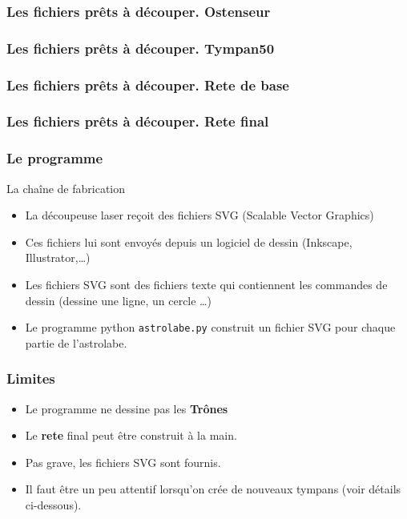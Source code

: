 \documentclass{beamer}
\begin{document}
\begin{frame}\frametitle{Les fichiers prêts à découper.  Ostenseur}
\begin{center}
\end{center}
   \end{frame}
   
\begin{frame}\frametitle{Les fichiers prêts à découper.  Tympan50}
\begin{center}
\end{center}
   \end{frame}
   

\begin{frame}\frametitle{Les fichiers prêts à découper.  Rete de base}
\begin{center}
\end{center}
   \end{frame}
   
\begin{frame}\frametitle{Les fichiers prêts à découper.  Rete final}
\begin{center}
\end{center}
   \end{frame}
   
\begin{frame}\frametitle{Le programme}
\begin{block}{La chaîne de fabrication}
\begin{itemize}
\item La découpeuse laser reçoit des fichiers SVG (Scalable Vector Graphics)
\item Ces fichiers lui sont envoyés depuis un logiciel de dessin (Inkscape, Illustrator,\dots)
\item Les fichiers SVG sont des fichiers texte qui contiennent les commandes de dessin
(dessine une ligne, un cercle \dots)
\item Le programme python {\tt astrolabe.py} construit un fichier SVG pour chaque partie de l'astrolabe. 
\end{itemize}

\end{block}
   \end{frame}
   

\begin{frame}\frametitle{Limites}
\begin{itemize}
\item Le programme ne dessine pas les {\bf Trônes}
\item Le {\bf rete} final peut être construit à la main.
\item Pas grave, les fichiers SVG sont fournis. 
\item Il faut être un peu attentif lorsqu'on crée de nouveaux tympans (voir détails ci-dessous). 
\end{itemize}

   \end{frame}
   
\end{document}
